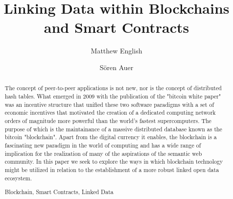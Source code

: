 \documentclass[runningheads,a4paper]{llncs}
\newcommand{\keywords}[1]{\par\addvspace\baselineskip
\noindent\keywordname\enspace\ignorespaces#1}
\begin{document}
\mainmatter  %

\title{Linking Data within Blockchains and Smart Contracts}



\author{Matthew English \and S\"oren Auer}
%



\maketitle


\begin{abstract}
The concept of peer-to-peer applications is not new, nor is the concept of distributed hash tables. What emerged in 2009 with the publication of the "bitcoin white paper" was an incentive structure that unified these two software paradigms with a set of economic incentives that motivated the creation of a dedicated computing network orders of magnitude more powerful than the world's fastest supercomputers. The purpose of which is the maintainance of a massive distributed database known as the bitcoin "blockchain". Apart from the digital currency it enables, the blockchain is a fascinating new paradigm in the world of computing and has a wide range of implication for the realization of many of the aspirations of the semantic web community. In this paper we seek to explore the ways in which blockchain technology might be utilized in relation to the establishment of a more robust linked open data ecosystem. 




\keywords{Blockchain, Smart Contracts, Linked Data}
\end{abstract}
\end{document}
